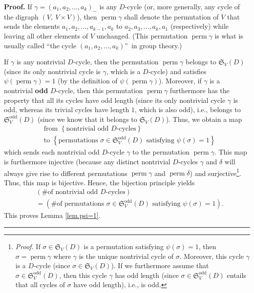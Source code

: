 \documentclass[numbers=enddot,12pt,final,onecolumn,notitlepage]{scrartcl}%
\numberwithin{exer}{section}
\theoremstyle{definition}
\newenvironment{proof}[1][Proof]{\noindent\textbf{#1.} }{\ \rule{0.5em}{0.5em}}
\begin{document}
\begin{proof}
If $\gamma=\left(  a_{1},a_{2},\ldots,a_{k}\right)  _{\sim}$ is any $D$-cycle
(or, more generally, any cycle of the digraph $\left(  V,\ V\times V\right)
$), then $\operatorname*{perm}\gamma$ shall denote the permutation of $V$ that
sends the elements $a_{1},a_{2},\ldots,a_{k-1},a_{k}$ to $a_{2},a_{3}%
,\ldots,a_{k},a_{1}$ (respectively) while leaving all other elements of $V$
unchanged. (This permutation $\operatorname*{perm}\gamma$ is what is usually
called \textquotedblleft the cycle $\left(  a_{1},a_{2},\ldots,a_{k}\right)
$\textquotedblright\ in group theory.)

If $\gamma$ is any nontrivial $D$-cycle, then the permutation
$\operatorname*{perm}\gamma$ belongs to $\mathfrak{S}_{V}\left(  D\right)  $
(since its only nontrivial cycle is $\gamma$, which is a $D$-cycle) and
satisfies $\psi\left(  \operatorname*{perm}\gamma\right)  =1$ (by the
definition of $\psi\left(  \operatorname*{perm}\gamma\right)  $). Moreover, if
$\gamma$ is a nontrivial \textbf{odd} $D$-cycle, then this permutation
$\operatorname*{perm}\gamma$ furthermore has the property that all its cycles
have odd length (since its only nontrivial cycle $\gamma$ is odd, whereas its
trivial cycles have length $1$, which is also odd), i.e., belongs to
$\mathfrak{S}_{V}^{\operatorname*{odd}}\left(  D\right)  $ (since we know that
it belongs to $\mathfrak{S}_{V}\left(  D\right)  $). Thus, we obtain a map%
\begin{align*}
&  \text{from }\left\{  \text{nontrivial odd }D\text{-cycles}\right\} \\
&  \text{to }\left\{  \text{permutations }\sigma\in\mathfrak{S}_{V}%
^{\operatorname*{odd}}\left(  D\right)  \text{ satisfying }\psi\left(
\sigma\right)  =1\right\}
\end{align*}
which sends each nontrivial odd $D$-cycle $\gamma$ to the permutation
$\operatorname*{perm}\gamma$. This map is furthermore injective (because any
distinct nontrivial $D$-cycles $\gamma$ and $\delta$ will always give rise to
different permutations $\operatorname*{perm}\gamma$ and $\operatorname*{perm}%
\delta$) and surjective\footnote{\textit{Proof.} If $\sigma\in\mathfrak{S}%
_{V}\left(  D\right)  $ is a permutation satisfying $\psi\left(
\sigma\right)  =1$, then $\sigma=\operatorname*{perm}\gamma$ where $\gamma$ is
the unique nontrivial cycle of $\sigma$. Moreover, this cycle $\gamma$ is a
$D$-cycle (since $\sigma\in\mathfrak{S}_{V}\left(  D\right)  $). If we
furthermore assume that $\sigma\in\mathfrak{S}_{V}^{\operatorname*{odd}%
}\left(  D\right)  $, then this cycle $\gamma$ has odd length (since
$\sigma\in\mathfrak{S}_{V}^{\operatorname*{odd}}\left(  D\right)  $ entails
that all cycles of $\sigma$ have odd length), i.e., is odd.}. Thus, this map
is bijective. Hence, the bijection principle yields%
\begin{align*}
&  \left(  \text{\# of nontrivial odd }D\text{-cycles}\right) \\
&  =\left(  \text{\# of permutations }\sigma\in\mathfrak{S}_{V}%
^{\operatorname*{odd}}\left(  D\right)  \text{ satisfying }\psi\left(
\sigma\right)  =1\right)  .
\end{align*}
This proves Lemma \ref{lem.psi=1}.
\end{proof}
\end{document}
